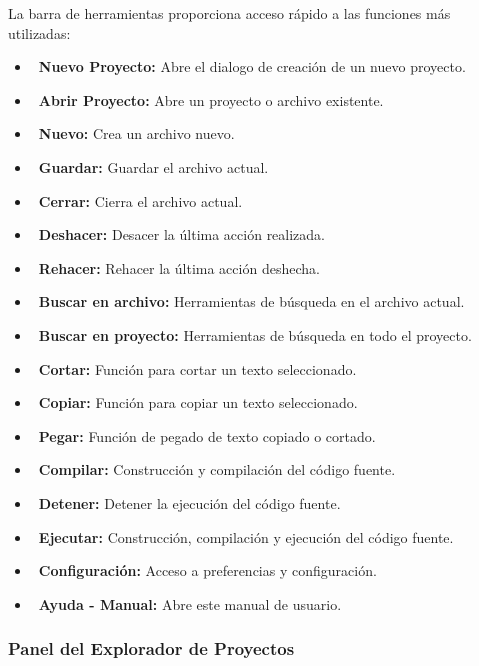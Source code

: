 \documentclass[../../main.tex]{subfiles}
\begin{document}
\par{La barra de herramientas proporciona acceso rápido a las funciones más utilizadas:}

\begin{itemize}
    \item \faFolderPlus\ \textbf{Nuevo Proyecto:} Abre el dialogo de creación de un nuevo proyecto.
    \item \faFolderOpen\ \textbf{Abrir Proyecto:} Abre un proyecto o archivo existente.
    \item \faFile\ \textbf{Nuevo:} Crea un archivo nuevo.
    \item \faSave\ \textbf{Guardar:} Guardar el archivo actual.
    \item \faTimes\ \textbf{Cerrar:} Cierra el archivo actual.
    \item \faUndo\ \textbf{Deshacer:} Desacer la última acción realizada.
    \item \faRedo\ \textbf{Rehacer:} Rehacer la última acción deshecha.
    \item \faSearch\ \textbf{Buscar en archivo:} Herramientas de búsqueda en el archivo actual.
    \item \faSearchPlus\ \textbf{Buscar en proyecto:} Herramientas de búsqueda en todo el proyecto.
    \item \faCut\ \textbf{Cortar:} Función para cortar un texto seleccionado.
    \item \faCopy\ \textbf{Copiar:} Función para copiar un texto seleccionado.
    \item \faPaste\ \textbf{Pegar:} Función de pegado de texto copiado o cortado.
    \item \faHammer\ \textbf{Compilar:} Construcción y compilación del código fuente.
    \item \faStop\ \textbf{Detener:} Detener la ejecución del código fuente.
    \item \faPlay\ \textbf{Ejecutar:} Construcción, compilación y ejecución del código fuente.
    \item \faCog\ \textbf{Configuración:} Acceso a preferencias y configuración.
    \item \faQuestionCircle\ \textbf{Ayuda - Manual:} Abre este manual de usuario.
\end{itemize}

\subsubsection{Panel del Explorador de Proyectos}
\end{document}
